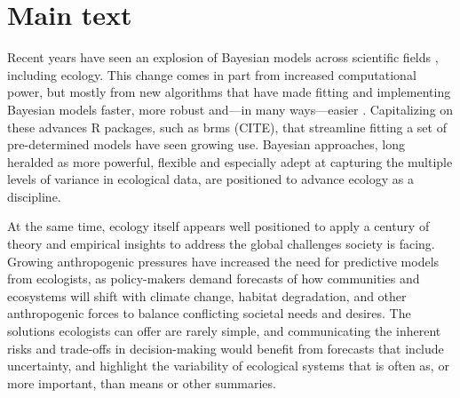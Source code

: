 \documentclass[11pt]{article}
\begin{document}
{\setlength{\parindent}{0pt}
\setlength{\parskip}{7pt}

\section*{Main text}
Recent years have seen an explosion of Bayesian models across scientific fields \citep{vandeschoot2021,schad2021,grinsztajn2021}, including ecology. This change comes in part from increased computational power, but mostly from new algorithms \citep[e.g. Hamiltonian Monte Carlo,][]{nuts2014,betan2019} that have made fitting and implementing Bayesian models faster, more robust and---in many ways---easier \citep{Carpenter:2017stan}. Capitalizing on these advances \textsf{R} packages, such as \textsf{brms} (CITE), that streamline fitting a set of pre-determined models have seen growing use. Bayesian approaches, long heralded as more powerful, flexible and especially adept at capturing the multiple levels of variance in ecological data, are positioned to advance ecology as a discipline. %

 
At the same time, ecology itself appears well positioned to apply a century of theory and empirical insights to address the global challenges society is facing. Growing anthropogenic pressures have increased the need for predictive models from ecologists, as policy-makers demand forecasts of how communities and ecosystems will shift with climate change, habitat degradation, and other anthropogenic forces to balance conflicting societal needs and desires. The solutions ecologists can offer are rarely simple, and communicating the inherent risks and trade-offs in decision-making would benefit from forecasts that include uncertainty, and highlight the variability of ecological systems that is often as, or more important, than means or other summaries. %

}
\end{document}
